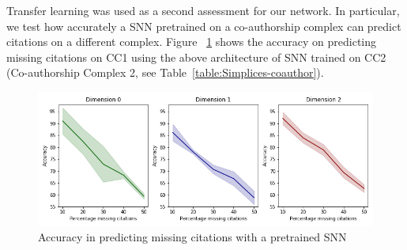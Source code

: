 Transfer learning was used as a second assessment for our network. In particular, we test how accurately a SNN pretrained on a co-authorship complex can predict citations on a different complex. Figure ~\ref{fig:transfer-learning} shows the accuracy on predicting missing citations on CC1 using the above architecture of SNN trained on CC2 (Co-authorship Complex 2, see Table~\ref{table:Simplices-coauthor}).



\begin{figure}[htbp]
  \centering
\includegraphics[scale=0.4]{./figures/accuracy_network1_pretrained.png}
  \caption{Accuracy in predicting missing citations with a pretrained SNN } \label{fig:transfer-learning}
\end{figure}

